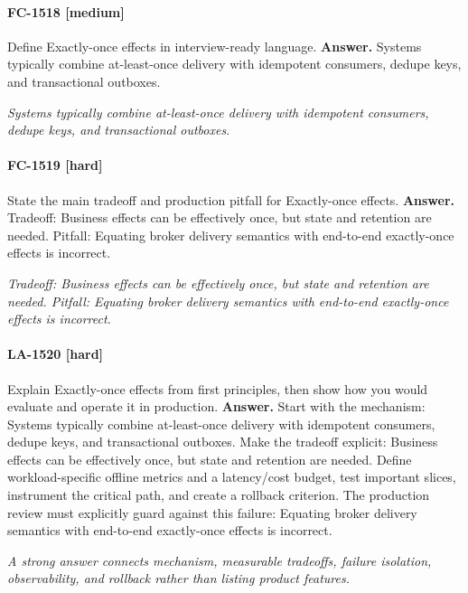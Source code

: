 \paragraph{FC-1518 [medium]} Define Exactly-once effects in interview-ready language.
\noindent\textbf{Answer.} Systems typically combine at-least-once delivery with idempotent consumers, dedupe keys, and transactional outboxes.
\par\textit{Systems typically combine at-least-once delivery with idempotent consumers, dedupe keys, and transactional outboxes.}
\paragraph{FC-1519 [hard]} State the main tradeoff and production pitfall for Exactly-once effects.
\noindent\textbf{Answer.} Tradeoff: Business effects can be effectively once, but state and retention are needed. Pitfall: Equating broker delivery semantics with end-to-end exactly-once effects is incorrect.
\par\textit{Tradeoff: Business effects can be effectively once, but state and retention are needed. Pitfall: Equating broker delivery semantics with end-to-end exactly-once effects is incorrect.}
\paragraph{LA-1520 [hard]} Explain Exactly-once effects from first principles, then show how you would evaluate and operate it in production.
\noindent\textbf{Answer.} Start with the mechanism: Systems typically combine at-least-once delivery with idempotent consumers, dedupe keys, and transactional outboxes. Make the tradeoff explicit: Business effects can be effectively once, but state and retention are needed. Define workload-specific offline metrics and a latency/cost budget, test important slices, instrument the critical path, and create a rollback criterion. The production review must explicitly guard against this failure: Equating broker delivery semantics with end-to-end exactly-once effects is incorrect.
\par\textit{A strong answer connects mechanism, measurable tradeoffs, failure isolation, observability, and rollback rather than listing product features.}
